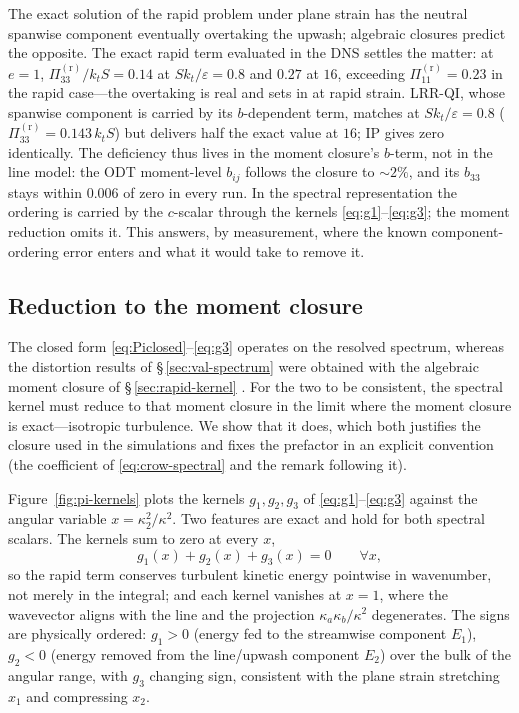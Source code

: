 \documentclass[lineno]{JFM-FLM_Au}
\begin{document}
The exact solution of the rapid problem under plane strain has the neutral
spanwise component eventually overtaking the upwash; algebraic closures
predict the opposite. The exact rapid term evaluated in the DNS settles the
matter: at $e=1$, $\Pi^{(\mathrm r)}_{33}/k_tS = 0.14$ at
$Sk_t/\varepsilon=0.8$ and $0.27$ at $16$, exceeding
$\Pi^{(\mathrm r)}_{11}=0.23$ in the rapid case---the overtaking is real
and sets in at rapid strain. LRR-QI, whose spanwise component is carried by
its $b$-dependent term, matches at $Sk_t/\varepsilon=0.8$
($\Pi^{(\mathrm r)}_{33}=0.143\,k_tS$) but delivers half the exact value at
$16$; IP gives zero identically. The deficiency thus lives in the moment
closure's $b$-term, not in the line model: the ODT moment-level $b_{ij}$
follows the closure to $\sim2\%$, and its $b_{33}$ stays within $0.006$ of
zero in every run. In the spectral representation the ordering is carried
by the $c$-scalar through the kernels
\eqref{eq:g1}--\eqref{eq:g3}; the moment reduction omits it. This
answers, by measurement, where the known component-ordering error enters
and what it would take to remove it.

\subsection{Reduction to the moment closure}\label{sec:lrr-reduction}

The closed form \eqref{eq:Piclosed}--\eqref{eq:g3} operates on the resolved
spectrum, whereas the distortion results of \S\,\ref{sec:val-spectrum} were
obtained with the algebraic moment closure of \S\,\ref{sec:rapid-kernel}
\citep{LaunderReeceRodi1975}. For the two to be consistent, the spectral
kernel must reduce to that moment closure in the limit where the moment
closure is exact---isotropic turbulence. We show that it does, which both
justifies the closure used in the simulations and fixes the prefactor in an explicit convention (the coefficient of \eqref{eq:crow-spectral} and the remark following it).

Figure~\ref{fig:pi-kernels} plots the kernels $g_1,g_2,g_3$ of
\eqref{eq:g1}--\eqref{eq:g3} against the angular variable
$x=\kappa_2^2/\kappa^2$. Two features are exact and hold for both spectral
scalars. The kernels sum to zero at every $x$,
\begin{equation}
  g_1(x)+g_2(x)+g_3(x)=0 \qquad \forall x,
  \label{eq:gtrace}
\end{equation}
so the rapid term conserves turbulent kinetic energy pointwise in wavenumber,
not merely in the integral; and each kernel vanishes at $x=1$, where the
wavevector aligns with the line and the projection $\kappa_a\kappa_b/\kappa^2$
degenerates. The signs are physically ordered: $g_1>0$ (energy fed to the
streamwise component $E_1$), $g_2<0$ (energy removed from the line/upwash
component $E_2$) over the bulk of the angular range, with $g_3$ changing sign,
consistent with the plane strain stretching $x_1$ and compressing $x_2$.
\end{document}
